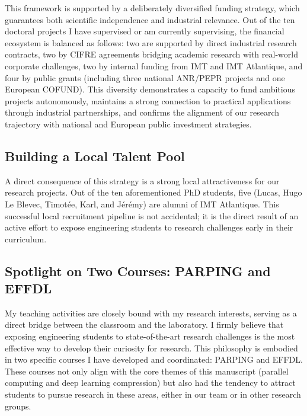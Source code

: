 \documentclass[11pt]{report}
\begin{document}
This framework is supported by a deliberately diversified funding strategy, which guarantees both scientific independence and industrial relevance. Out of the ten doctoral projects I have supervised or am currently supervising, the financial ecosystem is balanced as follows: two are supported by direct industrial research contracts, two by CIFRE agreements bridging academic research with real-world corporate challenges, two by internal funding from IMT and IMT Atlantique, and four by public grants (including three national ANR/PEPR projects and one European COFUND). This diversity demonstrates a capacity to fund ambitious projects autonomously, maintains a strong connection to practical applications through industrial partnerships, and confirms the alignment of our research trajectory with national and European public investment strategies.

\subsection{Building a Local Talent Pool}
\label{sec:local_talent}

A direct consequence of this strategy is a strong local attractiveness for our research projects. Out of the ten aforementioned PhD students, five (Lucas, Hugo Le Blevec, Timotée, Karl, and Jérémy) are alumni of IMT Atlantique. This successful local recruitment pipeline is not accidental; it is the direct result of an active effort to expose engineering students to research challenges early in their curriculum.

\subsection{Spotlight on Two Courses: PARPING and EFFDL}
\label{sec:spotlight_courses}

My teaching activities are closely bound with my research interests, serving as a direct bridge between the classroom and the laboratory. I firmly believe that exposing engineering students to state-of-the-art research challenges is the most effective way to develop their curiosity for research. This philosophy is embodied in two specific courses I have developed and coordinated: PARPING and EFFDL. These courses not only align with the core themes of this manuscript (parallel computing and deep learning compression) but also had the tendency to attract students to pursue research in these areas, either in our team or in other research groups.
\end{document}
